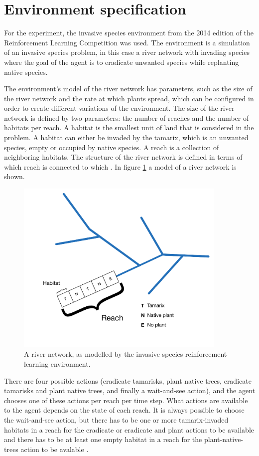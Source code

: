 \section{Environment specification}
\label{sec:experiment_env}

For the experiment, the invasive species environment from the 2014 edition of
the Reinforcement Learning Competition was used. The environment is a
simulation of an invasive species problem, in this case a river network with
invading species where the goal of the agent is to eradicate unwanted species
while replanting native species. 

The environment's model of the river network has parameters, such as the size
of the river network and the rate at which plants spread, which can be
configured in order to create different variations of the environment.  The
size of the river network is defined by two parameters: the number of reaches
and the number of habitats per reach. A habitat is the smallest unit of land
that is considered in the problem. A habitat can either be invaded by the
tamarix, which is an unwanted species, empty or occupied by native species. A
reach is a collection of neighboring habitats. The structure of the river
network is defined in terms of which reach is connected to which
\parencite{invasiveSpecis2014:Online}. In figure \ref{fig:river} a model of a
river network is shown.

\begin{figure}[ht]
\centering
\includegraphics[width=0.9\textwidth]{images/river_network.pdf}
\caption{A river network, as modelled by the invasive species reinforcement learning environment.}
\label{fig:river}
\end{figure}

There are four possible actions (eradicate tamarisks, plant native trees,
eradicate tamarisks and plant native trees, and finally a wait-and-see action),
and the agent chooses one of these actions per reach per time step. What
actions are available to the agent depends on the state of each reach. It is
always possible to choose the wait-and-see action, but there has to be one
or more tamarix-invaded habitats in a reach for the eradicate or eradicate and
plant actions to be available and there has to be at least one empty habitat in
a reach for the plant-native-trees action to be avalable
\parencite{invasiveSpecis2014:Online}. 
